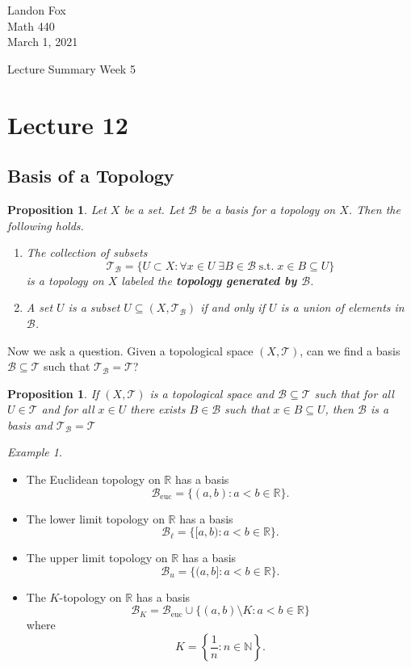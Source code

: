 \documentclass[ 12pt ]{article}
\newcounter{lecture_num}
\theoremstyle{plain}
\theoremstyle{plain}
\newtheorem{proposition}[theorem]{Proposition}
\theoremstyle{definition}
\theoremstyle{remark}
\newtheorem{example}[theorem]{Example}
\begin{document}
\noindent Landon Fox \\
\noindent Math 440 \\
\noindent March 1, 2021

\begin{center}
	\Large Lecture Summary Week 5
\end{center}

\setcounter{lecture_num}{12}
\setcounter{theorem}{0}
\section*{Lecture 12}

\subsection*{Basis of a Topology}

\begin{proposition}
	Let $X$ be a set. Let $\mathcal{B}$ be a basis for a topology on $X$. Then the following holds.
	\begin{enumerate}
		\item The collection of subsets $$\mathcal{T}_\mathcal{B} = \{ U \subset X : \forall x \in U\; \exists B \in \mathcal{B}\; \mathrm{s.t.}\; x \in B \subseteq U \}$$ is a topology
			on $X$ labeled the \textbf{topology generated by $\mathcal{B}$}.
		\item A set $U$ is a subset $U \subseteq (X, \mathcal{T}_\mathcal{B})$ if and only if $U$ is a union of elements in $\mathcal{B}$.
	\end{enumerate}
\end{proposition}

Now we ask a question. Given a topological space $(X, \mathcal{T})$, can we find a basis $\mathcal{B} \subseteq \mathcal{T}$ such that $\mathcal{T}_\mathcal{B} = \mathcal{T}$?

\begin{proposition}
	If $(X, \mathcal{T})$ is a topological space and $\mathcal{B} \subseteq \mathcal{T}$ such that for all $U \in \mathcal{T}$ and for all $x \in U$ there exists $B \in \mathcal{B}$ such
	that $x \in B \subseteq U$, then $\mathcal{B}$ is a basis and $\mathcal{T}_\mathcal{B} = \mathcal{T}$
\end{proposition}

\begin{example} $ $
	\begin{itemize}
		\item The Euclidean topology on $\mathbb{R}$ has a basis $$\mathcal{B}_\mathrm{euc} = \{ (a, b) : a < b \in \mathbb{R} \}.$$
		\item The lower limit topology on $\mathbb{R}$ has a basis $$\mathcal{B}_\ell = \{ [a, b) : a < b \in \mathbb{R} \}.$$
		\item The upper limit topology on $\mathbb{R}$ has a basis $$\mathcal{B}_u = \{ (a, b]: a < b \in \mathbb{R} \}.$$
		\item The $K$-topology on $\mathbb{R}$ has a basis $$\mathcal{B}_K = \mathcal{B}_\mathrm{euc} \cup \{ (a, b) \setminus K : a < b \in \mathbb{R} \}$$ where $$K = \left \{
			\frac{1}{n} : n \in \mathbb{N} \right \}.$$
	\end{itemize}
\end{example}
\end{document}
